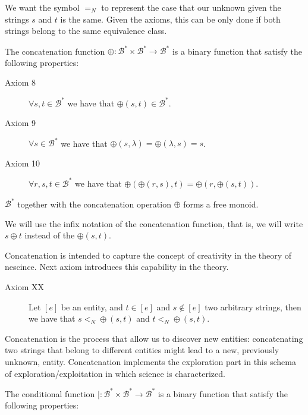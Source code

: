 We want the symbol $=_N$ to represent the case that our unknown given the strings $s$ and $t$ is the same. Given the axioms, this can be only done if both strings belong to the same equivalence class.


The concatenation function $\oplus : \mathcal{B}^\ast \times \mathcal{B}^\ast \rightarrow \mathcal{B}^\ast$ is a binary function that satisfy the following properties:

\vskip 0.25cm

\begin{description}
\item[Axiom 8] $\forall s, t \in \mathcal{B}^\ast$ we have that $\oplus(s, t) \in \mathcal{B}^\ast$.
\item[Axiom 9] $\forall s \in \mathcal{B}^\ast$ we have that $\oplus(s, \lambda) = \oplus( \lambda, s) = s$.
\item[Axiom 10] $\forall r, s, t \in \mathcal{B}^\ast$ we have that $\oplus(\oplus(r, s), t) = \oplus(r, \oplus(s, t))$.
\end{description}

\vskip 0.25cm

$\mathcal{B}^\ast$ together with the concatenation operation $\oplus$ forms a free monoid.

\begin{notation}
We will use the infix notation of the concatenation function, that is, we will write $s \oplus t$ instead of the $\oplus(s, t)$.
\end{notation}

Concatenation is intended to capture the concept of creativity in the theory of nescince. Next axiom introduces this capability in the theory.

\begin{description}
\item[Axiom XX] Let $[e]$ be an entity, and $t \in [e]$ and $s \notin [e]$ two arbitrary strings, then we have that $s <_N \oplus(s, t)$ and $t <_N \oplus(s, t)$.
\end{description}

Concatenation is the process that allow us to discover new entities: concatenating two strings that belong to different entities might lead to a new, previously unknown, entity. Concatenation implements the exploration part in this schema of exploration/exploitation in which science is characterized. 

The conditional function $\mid : \mathcal{B}^\ast \times \mathcal{B}^\ast \rightarrow \mathcal{B}^\ast$ is a binary function that satisfy the following properties:

